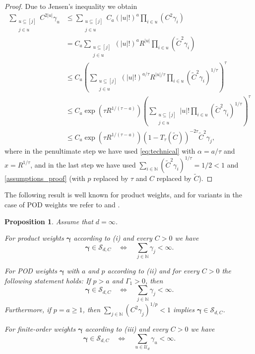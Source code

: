 \documentclass{article}
\newcommand{\N}  {{\mathbb N}}
\newcommand{\bg}{{\boldsymbol{\gamma}}}
\newcommand{\U}  {\mathcal{U}}
\newcommand{\SSS}{\mathcal{S}}
\theoremstyle{plain}
\newtheorem{prop}{Proposition}
\theoremstyle{definition}
\begin{document}
\begin{proof}
Due to Jensen's inequality we obtain
\begin{align*}
\sum_{\substack{u \subseteq [j] \\ j\in u}}
C^{2|u|} \gamma_u 
&\le   
\sum_{\substack{u \subseteq [j] \\ j\in u}}
C_a \left( |u|! \right)^a \prod_{i \in u} \left( C^{2} \gamma_i \right) \\
&=   C_a 
\sum_{\substack{u \subseteq [j] \\ j\in u}}
\left( |u|! \right)^a  R^{|u|} \prod_{i \in u} \left(
\widetilde{C}^{2} \gamma_i \right) \\
& \le	 C_a \left(
\sum_{\substack{u \subseteq [j] \\ j\in u}}
\left( |u|! \right)^{a/\tau}
R^{|u|/\tau} \prod_{i \in u} \left(
\widetilde{C}^{2} \gamma_i \right)^{1/\tau}
\right)^{\tau}\\
&\le  C_a 
\exp(\tau R^{1/(\tau-a)})
\left(
\sum_{\substack{u \subseteq [j] \\ j\in u}}
|u|!   \prod_{i \in u} \left( \widetilde{C}^{2} \gamma_i
\right)^{1/\tau} \right)^{\tau} \\
&\le 
C_a  \exp(\tau R^{1/(\tau-a)})
\left( 1-T_{\tau} (\widetilde{C}) \right)^{-2\tau} \widetilde{C}^2 
\gamma_j,
\end{align*}
where in the penultimate step we have used 
\eqref{eq:technical} with $\alpha=a/\tau$ 
and $x=R^{1/\tau}$, and in the last step we have used $\sum_{i \in \N} 
\left(\widetilde{C}^2 \gamma_i\right)^{1/\tau} = 1/2 < 1$ and 
\eqref{assumptions_proof} 
(with $p$ replaced by $\tau$ and $C$ replaced by $\widetilde{C}$).
\end{proof}

The following result is well known for product weights,
and for variants in the case of POD weights we refer to
\citet[Lem.~6.2]{KSS12} and \citet[Sec.~4.3]{DG12}.

\begin{prop}\label{l4}
Assume that $d = \infty$.

For product weights $\bg$ according to (i) and every $C > 0$ 
we have
\[
\bg \in \SSS_{d,C} \quad \Leftrightarrow \quad 
\sum_{j \in \N} \gamma_j < \infty.
\]

For POD weights $\bg$ with $a$ and $p$ according to (ii) 
and for every $C>0$ the following statement holds:
If $p>a$ and $\Gamma_1>0$, then 
\[
\bg \in \SSS_{d,C} \quad \Leftrightarrow \quad 
\sum_{j \in \N} \gamma_j < \infty.
\]
Furthermore, if $p=a \ge 1$, then 
$\sum_{j\in \N} \left( C^2 \gamma_j \right)^{1/p} 
< 1$ implies $\bg \in \SSS_{d,C}$.

For finite-order weights $\bg$ 
according to (iii) and every $C>0$ we have 
\[
\bg \in \SSS_{d,C} \quad \Leftrightarrow \quad \sum_{u \in \U_d}
\gamma_u < \infty.
\]
\end{prop}
\end{document}
